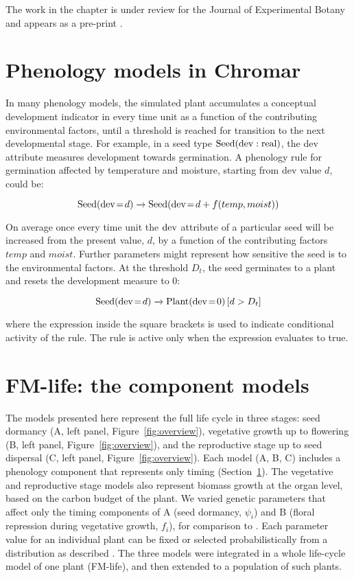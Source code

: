 The work in the chapter is under review for the Journal of Experimental Botany
and appears as a pre-print \citep{zardilis2018multi}.

\section{Phenology models in Chromar}
\label{phenMod}
In many phenology models, the simulated plant accumulates a conceptual
development indicator in every time unit as a function of the
contributing environmental factors, until a threshold is reached for
transition to the next developmental stage. For example, in a seed type
\(\mathrm{Seed}(\mathrm{dev}:\mathrm{real})\), the dev attribute measures
development towards germination. A phenology rule for germination
affected by temperature and moisture, starting from dev value $d$,
could be:

\[\mathrm{Seed}(\mathrm{dev} \! = \! {d}) \xrightarrow{} \mathrm{Seed}(\mathrm{dev} \! = \! {d + f(temp,moist)}) \]

On average once every time unit the $\mathrm{dev}$ attribute of a
particular seed will be increased from the present value, \(d\), by a
function of the contributing factors $temp$ and
$moist$. Further parameters might represent how sensitive the
seed is to the environmental factors. At the threshold
$D_t$, the seed germinates to a plant and resets the
development measure to 0:

\[\mathrm{Seed}(\mathrm{dev} \! = \! {d}) \xrightarrow{} \mathrm{Plant}(\mathrm{dev} \! = \! {0}) \, \lbrack d > D_{t}\rbrack \]

where the expression inside the square brackets is used to indicate
conditional activity of the rule. The rule is active only when the
expression evaluates to true.

\section{FM-life: the component models}
\label{sec:compModels}
The models presented here represent the full life cycle in three stages: seed
dormancy (A, left panel, Figure~\ref{fig:overview}), vegetative growth up to
flowering (B, left panel, Figure~\ref{fig:overview}), and the reproductive stage
up to seed dispersal (C, left panel, Figure~\ref{fig:overview}). Each model (A,
B, C) includes a phenology component that represents only timing
(Section~\ref{phenMod}). The vegetative and reproductive
stage models also represent biomass growth at the organ level, based on the
carbon budget of the plant. We varied genetic parameters that affect only the
timing components of A (seed dormancy, \(\psi_{i}\)) and B (floral repression
during vegetative growth, \(f_{i}\)), for comparison to
\citet{burghardt_modeling_2015}.  Each parameter value for an individual plant
can be fixed or selected probabilistically from a distribution as described
\citep{burghardt_modeling_2015}. The three models were integrated in a whole
life-cycle model of one plant (FM-life), and then extended to a population of
such plants.

